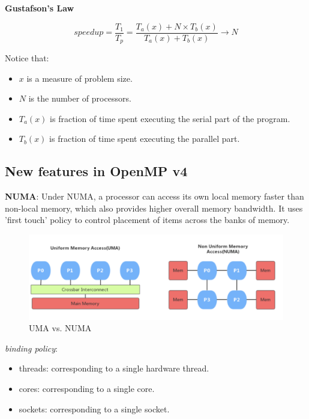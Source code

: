 \documentclass{article}
\begin{document}
\textbf{Gustafson's Law}

\begin{equation}
    speedup = \frac{T_1}{T_p} = \frac{T_{a}(x) + N \times T_{b}(x)}{T_{a}(x) + T_{b}(x)} \rightarrow N
\end{equation}

Notice that:
\begin{itemize}
    \item $x$ is a measure of problem size.
    \item $N$ is the number of processors.
    \item $T_a(x)$ is fraction of time spent executing the serial part of the program.
    \item $T_b(x)$ is fraction of time spent executing the parallel part.
\end{itemize}


\subsection{New features in OpenMP v4}

\textbf{NUMA}: Under NUMA, a processor can access its own local memory faster than non-local memory, which also provides higher overall memory bandwidth. It uses 'first touch' policy to control placement of items across the banks of memory.


\begin{figure}[h]
    \centering
    \includegraphics[scale=0.4]{images/uma-numa.png}
    \caption{UMA vs. NUMA}
    \label{fig:my_label}
\end{figure}

\textit{binding policy}:
\begin{itemize}
    \item threads: corresponding to a single hardware thread. \item cores: corresponding to a single core.
    \item sockets: corresponding to a single socket.
\end{itemize}
\end{document}
